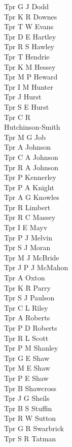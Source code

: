\begin{multicols}{4}
  Tpr G J Dodd \\
  Tpr K R Downes \\
  Tpr T W Evans \\
  Tpr D E Hartley \\
  Tpr R S Hawley \\
  Tpr T Hendrie \\
  Tpr K M Hessey \\
  Tpr M P Heward \\
  Tpr I M Hunter \\
  Tpr J Hurst \\
  Tpr S E Hurst \\
  Tpr C R \\ \indent Hutchinson-Smith \\
  Tpr M G Job \\
  Tpr A Johnson \\
  Tpr C A Johnson \\
  Tpr R A Johnson \\
  Tpr P Kennerley \\
  Tpr P A Knight \\
  Tpr A G Knowles \\
  Tpr R Limbert \\
  Tpr R C Massey \\
  Tpr I E Mayv \\
  Tpr P J Melvin \\
  Tpr S J Moran \\
  Tpr M J McBride \\
  Tpr J P J McMahon \\
  Tpr A Oxton \\
  Tpr K R Parry \\
  Tpr S J Paulson \\
  Tpr C L Riley \\
  Tpr A Roberts \\
  Tpr P D Roberts \\
  Tpr R L Scott \\
  Tpr P M Shanley \\
  Tpr G E Shaw \\
  Tpr M E Shaw \\
  Tpr P E Shaw \\
  Tpr B Shawcross \\
  Tpr J G Sheils \\
  Tpr B S Stuffin \\
  Tpr R W Sutton \\
  Tpr G R Swarbrick \\
  Tpr S R Tatman \\

\end{multicols}
